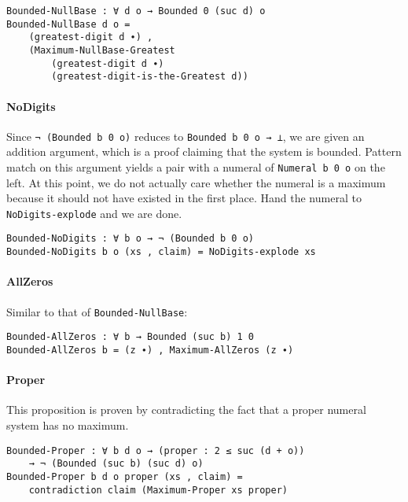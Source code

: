 \documentclass[\main/thesis.tex]{subfiles}
\begin{document}
\begin{lstlisting}
Bounded-NullBase : ∀ d o → Bounded 0 (suc d) o
Bounded-NullBase d o =
    (greatest-digit d ∙) ,
    (Maximum-NullBase-Greatest
        (greatest-digit d ∙)
        (greatest-digit-is-the-Greatest d))
\end{lstlisting}

\paragraph{NoDigits}

Since {\lstinline|¬ (Bounded b 0 o)|} reduces to {\lstinline|Bounded b 0 o → ⊥|},
we are given an addition argument, which is a proof claiming that the system is
bounded.
Pattern match on this argument yields a pair with a numeral of {\lstinline|Numeral b 0 o|} on the left.
At this point, we do not actually care whether the numeral is a maximum
because it should not have existed in the first place.
Hand the numeral to {\lstinline|NoDigits-explode|} and we are done.

\begin{lstlisting}
Bounded-NoDigits : ∀ b o → ¬ (Bounded b 0 o)
Bounded-NoDigits b o (xs , claim) = NoDigits-explode xs
\end{lstlisting}

\paragraph{AllZeros}

Similar to that of {\lstinline|Bounded-NullBase|}:

\begin{lstlisting}
Bounded-AllZeros : ∀ b → Bounded (suc b) 1 0
Bounded-AllZeros b = (z ∙) , Maximum-AllZeros (z ∙)
\end{lstlisting}

\paragraph{Proper}

This proposition is proven by contradicting the fact that
a proper numeral system has no maximum.

\begin{lstlisting}
Bounded-Proper : ∀ b d o → (proper : 2 ≤ suc (d + o))
    → ¬ (Bounded (suc b) (suc d) o)
Bounded-Proper b d o proper (xs , claim) =
    contradiction claim (Maximum-Proper xs proper)
\end{lstlisting}
\end{document}

